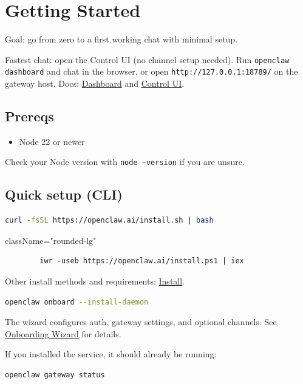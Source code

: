 \clearpage

\section{Getting Started}


Goal: go from zero to a first working chat with minimal setup.

Fastest chat: open the Control UI (no channel setup needed). Run \texttt{openclaw dashboard}
and chat in the browser, or open \texttt{http://127.0.0.1:18789/} on the
gateway host.
Docs: \href{/web/dashboard}{Dashboard} and \href{/web/control-ui}{Control UI}.

\subsection{Prereqs}


\begin{itemize}
  \item Node 22 or newer
\end{itemize}


Check your Node version with \texttt{node --version} if you are unsure.

\subsection{Quick setup (CLI)}


\begin{lstlisting}[language=bash]
        curl -fsSL https://openclaw.ai/install.sh | bash
\end{lstlisting}

className="rounded-lg"
\begin{lstlisting}
        iwr -useb https://openclaw.ai/install.ps1 | iex
\end{lstlisting}


Other install methods and requirements: \href{/install}{Install}.

\begin{lstlisting}[language=bash]
    openclaw onboard --install-daemon
\end{lstlisting}


The wizard configures auth, gateway settings, and optional channels.
See \href{/start/wizard}{Onboarding Wizard} for details.

If you installed the service, it should already be running:

\begin{lstlisting}[language=bash]
    openclaw gateway status
\end{lstlisting}



